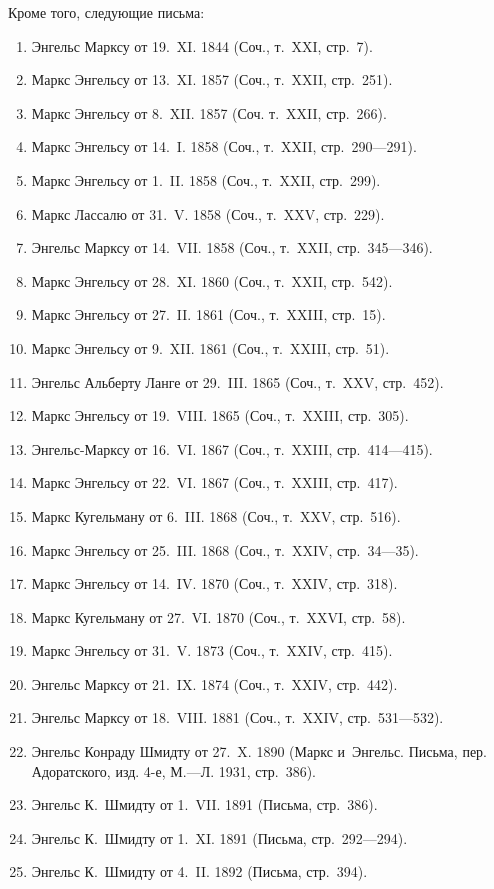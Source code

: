 Кроме того, следующие письма:
\begin{enumerate}
\item Энгельс Марксу от 19.~XI. 1844 (Соч., т.~XXI, стр.~7).
\item Маркс Энгельсу от 13.~XI. 1857 (Соч., т.~XXII, стр.~251).
\item Маркс Энгельсу от 8.~XII. 1857 (Соч. т.~XXII, стр.~266).
\item Маркс Энгельсу от 14.~I. 1858 (Соч., т.~XXII, стр.~290---291).
\item Маркс Энгельсу от 1.~II. 1858 (Соч., т.~XXII, стр.~299).
\item Маркс Лассалю от 31.~V. 1858 (Соч., т.~XXV, стр.~229).
\item Энгельс Марксу от 14.~VII. 1858 (Соч., т.~XXII, стр.~345---346).
\item Маркс Энгельсу от 28.~XI. 1860 (Соч., т.~XXII, стр.~542).
\item Маркс Энгельсу от 27.~II. 1861 (Соч., т.~XXIII, стр.~15).
\item Маркс Энгельсу от 9.~XII. 1861 (Соч., т.~XXIII, стр.~51).
\item Энгельс Альберту Ланге от 29.~III. 1865 (Соч., т.~XXV, стр.~452).
\item Маркс Энгельсу от 19.~VIII. 1865 (Соч., т.~XXIII, стр.~305).
\item Энгельс-Марксу от 16.~VI. 1867 (Соч., т.~XXIII, стр.~414---415).
\item Маркс Энгельсу от 22.~VI. 1867 (Соч., т.~XXIII, стр.~417).
\item Маркс Кугельману от 6.~III. 1868 (Соч., т.~XXV, стр.~516).
\item Маркс Энгельсу от 25.~III. 1868 (Соч., т.~XXIV, стр.~34---35).
\item Маркс Энгельсу от 14.~IV. 1870 (Соч., т.~XXIV, стр.~318).
\item Маркс Кугельману от 27.~VI. 1870 (Соч., т.~XXVI, стр.~58).
\item Маркс Энгельсу от 31.~V. 1873 (Соч., т.~XXIV, стр.~415).
\item Энгельс Марксу от 21.~IX. 1874 (Соч., т.~XXIV, стр.~442).
\item Энгельс Марксу от 18.~VIII. 1881 (Соч., т.~XXIV, стр.~531---532).
\item Энгельс Конраду Шмидту от 27.~X. 1890 (Маркс и~Энгельс. Письма,
пер. Адоратского, изд. 4-е, М.---Л. 1931, стр.~386).
\item Энгельс К.~Шмидту от 1.~VII. 1891 (Письма, стр.~386).
\item Энгельс К.~Шмидту от 1.~XI. 1891 (Письма, стр.~292---294).
\item Энгельс К.~Шмидту от 4.~II. 1892 (Письма, стр.~394).
\end{enumerate}

